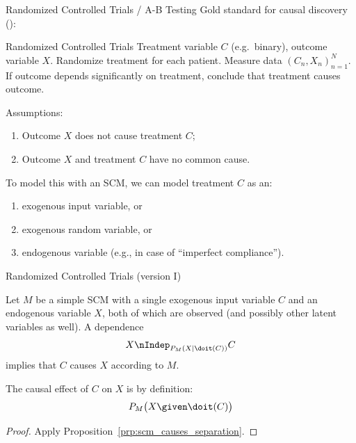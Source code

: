 \begin{frame}{Randomized Controlled Trials / A-B Testing}
  Gold standard for causal discovery (\cite{vanHelmont1648}):
  \begin{block}{Randomized Controlled Trials}
  Treatment variable $C$ (e.g.\ binary), outcome variable $X$.
  Randomize treatment for each patient.
  Measure data $(C_n,X_n)_{n=1}^N$.
  If outcome depends significantly on treatment, conclude that treatment causes outcome.
  \end{block}

  Assumptions:
  \begin{enumerate}
    \item Outcome $X$ does not cause treatment $C$;
    \item Outcome $X$ and treatment $C$ have no common cause.
  \end{enumerate}

  \bigskip
  To model this with an SCM, we can model treatment $C$ as an:
  \begin{enumerate}
    \item exogenous input variable, or
    \item exogenous random variable, or
    \item endogenous variable (e.g., in case of ``imperfect compliance'').
  \end{enumerate}
\end{frame}

\begin{frame}{Randomized Controlled Trials (version I)}
\begin{Prp}[\ref{prp:RCT1}]
Let $M$ be a simple SCM with a single exogenous input variable $C$ and an 
endogenous variable $X$, both of which are observed (and possibly other latent variables as well).
A dependence 
  $$X \nIndep_{P_{M}(X\mid\doit(C))} C $$
implies that $C$ causes $X$ according to $M$. 

The causal effect of $C$ on $X$ is by definition:
  $$P_{M}\big(X \given \doit(C)\big)$$
\end{Prp}
\begin{proof}
  Apply Proposition~\ref{prp:scm_causes_separation}.
\end{proof}
\end{frame}

